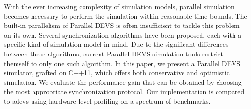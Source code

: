 With the ever increasing complexity of simulation models, parallel simulation
becomes necessary to perform the simulation within reasonable time bounds.
The built-in parallelism of Parallel DEVS is often insufficient to tackle this problem on its own. Several synchronization algorithms have been proposed,
each with a specific kind of simulation model in mind. Due to the significant
differences between these algorithms, current Parallel DEVS simulation tools
restrict themself to only one such algorithm. In this paper, we present a
Parallel DEVS simulator, grafted on C++11, which offers both conservative and
optimistic simulation. We evaluate the performance gain that can be obtained
by choosing the most appropriate synchronization protocol. Our implementation
is compared to adevs using hardware-level profiling on a spectrum of benchmarks.
